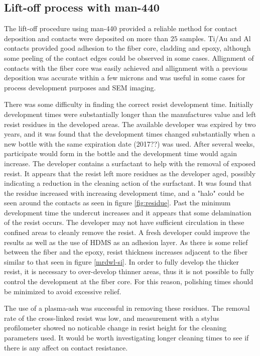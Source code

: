 \subsection{Lift-off process with man-440}
  The lift-off procedure using man-440 provided a reliable method for contact deposition and contacts were deposited on more than $25$ samples. Ti/Au and Al contacts provided good adhesion to the fiber core, cladding and epoxy, although some peeling of the contact edges could be observed in some cases. Allignment of contacts with the fiber core was easily achieved and allignment with a previous deposition was accurate within a few microns and was useful in some cases for process development purposes and SEM imaging. 
  
  There was some difficulty in finding the correct resist development time. Initially development times were substantially longer than the manufactures value and left resist residues in the developed areas. The available developer was expired by two years, and it was found that the development times changed substantially when a new bottle with the same expiration date (2017??) was used. After several weeks, participate would form in the bottle and the development time would again increase. The developer contains a surfactant to help with the removal of exposed resist. It appears that the resist left more residues as the developer aged, possibly indicating a reduction in the cleaning action of the surfactant. It was found that the residue increased with increasing development time, and a "halo" could be seen around the contacts as seen in figure \ref{fig:residue}. Past the minimum development time the undercut increases and it appears that some delamination of the resist occurs. The developer may not have sufficient circulation in these confined areas to cleanly remove the resist. A fresh developer could improve the results as well as the  use of HDMS as an adhesion layer. As there is some relief between the fiber and the epoxy, resist thickness increases adjacent to the fiber similar to that seen in figure \ref{mrdwl-si}. In order to fully develop the thicker resist, it is necessary to over-develop thinner areas, thus it is not possible to fully control the development at the fiber core. For this reason, polishing times should be minimized to avoid excessive relief. 
  
  
  The use of a plasma-ash was successful in removing these residues. The removal rate of the cross-linked resist was low, and measurement with a stylus profilometer showed no noticable change in resist height for the cleaning parameters used. It would be worth investigating longer cleaning times to see if there is any affect on contact resistance. 
 
